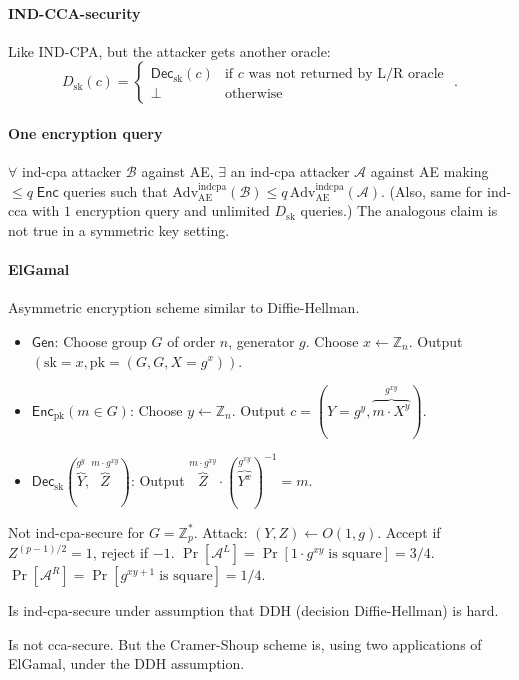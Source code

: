\documentclass[11pt]{article}
\newcommand{\Gen}{\ensuremath{\mathsf{Gen}}}
\newcommand{\Enc}{\ensuremath{\mathsf{Enc}}}
\newcommand{\Dec}{\ensuremath{\mathsf{Dec}}}
\newcommand{\ZZ}{\ensuremath{\mathds{Z}}}
\newcommand{\pk}{\text{pk}}
\newcommand{\sk}{\text{sk}}
\renewcommand{\AE}{\text{AE}}
\newcommand{\Adv}{\text{Adv}}
\newcommand{\indcpa}{\text{indcpa}}
\theoremstyle{remark}
\begin{document}
\paragraph{IND-CCA-security}
Like IND-CPA, but the attacker gets another oracle:
\[ D_\sk(c)=\begin{cases}
\Dec_\sk(c)&\text{if $c$ was not returned by L/R oracle}\\
\bot&\text{otherwise}
\end{cases}\text{ .} \]

\paragraph{One encryption query}
$\forall$ ind-cpa attacker $\mathcal{B}$ against AE,
$\exists$ an ind-cpa attacker $\mathcal{A}$ against AE
making $\le q\; \Enc$ queries
such that $\Adv_\AE^\indcpa(\mathcal{B}) \le q\,\Adv_\AE^\indcpa(\mathcal{A})$.
(Also, same for ind-cca with $1$ encryption query and unlimited $D_\sk$ queries.)
The analogous claim is not true in a symmetric key setting.

\paragraph{ElGamal}
Asymmetric encryption scheme similar to Diffie-Hellman.
\begin{itemize}
\item $\Gen$: Choose group $G$ of order $n$, generator $g$.
      Choose $x\gets\ZZ_n$. Output $(\sk=x,\pk=(G,G,X=g^x))$.
\item $\Enc_\pk(m\in G)$: Choose $y\gets\ZZ_n$.
      Output $c=(Y=g^y, \overbrace{m\cdot X^y}^{g^{xy}})$.
\item $\Dec_\sk(\overbrace{Y}^{g^y},\overbrace{Z}^{m\cdot g^{xy}})$:
      Output $\overbrace{Z}^{m\cdot g^{xy}}\cdot({\overbrace{Y^x}^{g^{xy}}})^{-1} = m$.
\end{itemize}

Not ind-cpa-secure for $G=\ZZ_p^*$.
Attack: $(Y,Z)\gets O(1,g)$.
Accept if $Z^{(p-1)/2}=1$, reject if $-1$.
$\Pr[\mathcal{A}^L]=\Pr[1\cdot g^{xy}\;\text{is square}]=3/4$.
$\Pr[\mathcal{A}^R]=\Pr[g^{xy+1}\;\text{is square}]=1/4$.

Is ind-cpa-secure under assumption that DDH (decision Diffie-Hellman) is hard.

Is not cca-secure.
But the Cramer-Shoup scheme is,
using two applications of ElGamal,
under the DDH assumption.
\end{document}

